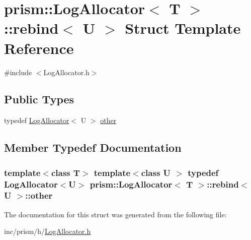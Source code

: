 \hypertarget{structprism_1_1_log_allocator_1_1rebind}{}\section{prism\+:\+:Log\+Allocator$<$ T $>$\+:\+:rebind$<$ U $>$ Struct Template Reference}
\label{structprism_1_1_log_allocator_1_1rebind}


{\ttfamily \#include $<$Log\+Allocator.\+h$>$}

\subsection*{Public Types}
\begin{DoxyCompactItemize}
\item 
typedef \hyperlink{classprism_1_1_log_allocator}{Log\+Allocator}$<$ U $>$ \hyperlink{structprism_1_1_log_allocator_1_1rebind_a72f405cf30fe3b5bd36da818f4e532c8}{other}
\end{DoxyCompactItemize}


\subsection{Member Typedef Documentation}
\subsubsection[{\texorpdfstring{other}{other}}]{\setlength{\rightskip}{0pt plus 5cm}template$<$class T$>$ template$<$class U $>$ typedef {\bf Log\+Allocator}$<$U$>$ {\bf prism\+::\+Log\+Allocator}$<$ T $>$\+::{\bf rebind}$<$ U $>$\+::{\bf other}}\hypertarget{structprism_1_1_log_allocator_1_1rebind_a72f405cf30fe3b5bd36da818f4e532c8}{}\label{structprism_1_1_log_allocator_1_1rebind_a72f405cf30fe3b5bd36da818f4e532c8}


The documentation for this struct was generated from the following file\+:\begin{DoxyCompactItemize}
\item 
inc/prism/h/\hyperlink{_log_allocator_8h}{Log\+Allocator.\+h}\end{DoxyCompactItemize}
